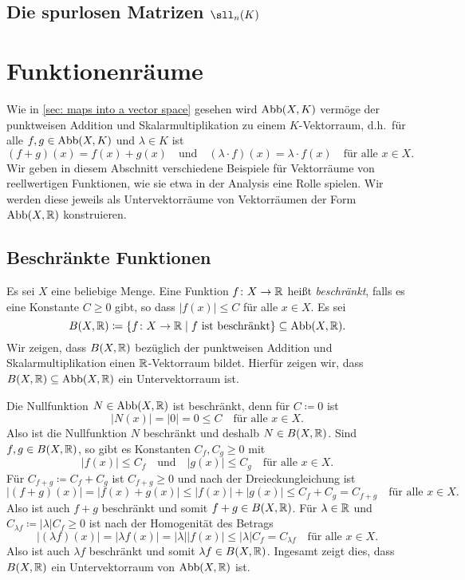 \subsection{Die spurlosen Matrizen \texorpdfstring{$\sll_n(K)$}{sln(K)}}





\section{Funktionenräume}
Wie in \ref{sec: maps into a vector space} gesehen wird $\mathrm{Abb}(X,K)$ vermöge der punktweisen Addition und Skalarmultiplikation zu einem $K$-Vektorraum, d.h.\ für alle $f,g \in \mathrm{Abb}(X,K)$ und $\lambda \in K$ ist
\[
 (f+g)(x) = f(x)+g(x)
 \quad\text{und}\quad
 (\lambda \cdot f)(x) = \lambda \cdot f(x)
 \quad\text{für alle $x \in X$}.
\]
Wir geben in diesem Abschnitt verschiedene Beispiele für Vektorräume von reellwertigen Funktionen, wie sie etwa in der Analysis eine Rolle spielen. Wir werden diese jeweils als Untervektorräume von Vektorräumen der Form $\mathrm{Abb}(X,\mathbb{R})$ konstruieren.


\subsection{Beschränkte Funktionen}
Es sei $X$ eine beliebige Menge. Eine Funktion $f \colon X \to \mathbb{R}$ heißt \emph{beschränkt}, falls es eine Konstante $C \geq 0$ gibt, so dass $|f(x)| \leq C$ für alle $x \in X$. Es sei
\[
 B(X, \mathbb{R})
 \coloneqq \{f \colon X \to \mathbb{R} \mid \text{$f$ ist beschränkt}\}
 \subseteq \mathrm{Abb}(X,\mathbb{R}).
\]
Wir zeigen, dass $B(X,\mathbb{R})$ bezüglich der punktweisen Addition und Skalarmultiplikation einen $\mathbb{R}$-Vektorraum bildet. Hierfür zeigen wir, dass $B(X, \mathbb{R}) \subseteq \mathrm{Abb}(X,\mathbb{R})$ ein Untervektorraum ist.

Die Nullfunktion $N \in \mathrm{Abb}(X,\mathbb{R})$ ist beschränkt, denn für $C \coloneqq 0$ ist
\[
 |N(x)| = |0| = 0 \leq C 
 \quad\text{für alle $x \in X$}.
\]
Also ist die Nullfunktion $N$ beschränkt und deshalb $N \in B(X, \mathbb{R})$. Sind $f, g \in B(X, \mathbb{R})$, so gibt es Konstanten $C_f, C_g \geq 0$ mit
\[
 |f(x)| \leq C_f
 \quad\text{und}\quad
 |g(x)| \leq C_g
 \quad
 \text{für alle $x \in X$}.
\]
Für $C_{f+g} \coloneqq C_f + C_g$ ist $C_{f+g} \geq 0$ und nach der Dreieckungleichung ist
\[
 |(f+g)(x)|
 = |f(x) + g(x)|
 \leq |f(x)| + |g(x)|
 \leq C_f + C_g
 = C_{f+g}
 \quad
 \text{für alle $x \in X$}.
\]
Also ist auch $f+g$ beschränkt und somit $f+g \in B(X, \mathbb{R})$. Für $\lambda \in \mathbb{R}$ und $C_{\lambda f} \coloneqq |\lambda| C_f \geq 0$ ist nach der Homogenität des Betrags
\[
 |(\lambda f)(x)|
 = |\lambda f(x)|
 = |\lambda| |f(x)|
 \leq |\lambda| C_f
 = C_{\lambda f}
 \quad
 \text{für alle $x \in X$}.
\]
Also ist auch $\lambda f$ beschränkt und somit $\lambda f \in B(X,\mathbb{R})$. Ingesamt zeigt dies, dass $B(X,\mathbb{R})$ ein Untervektorraum von $\mathrm{Abb}(X,\mathbb{R})$ ist.


